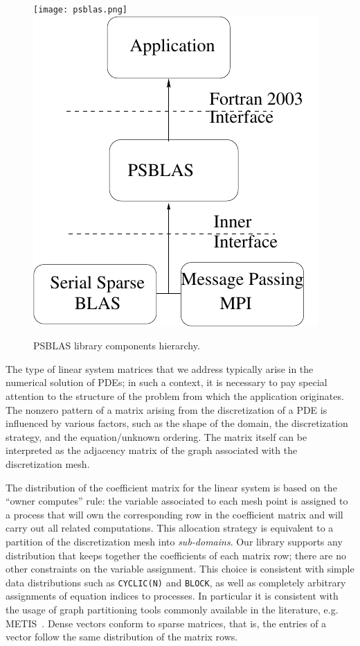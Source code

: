 \begin{figure}[h] 
\begin{center}
\ifcase\pdfoutput
\texttt{[image: psblas.png]}
\or
\includegraphics[scale=0.65]{figures/psblas}
\fi
\end{center}
\caption{PSBLAS library components hierarchy.\label{fig:psblas}}
\end{figure}


The type of linear system matrices that we address  typically arise in the
numerical solution of PDEs;  in such a context,
it is necessary to pay special attention to the
structure of the problem from which the application originates. 
The nonzero pattern of a matrix arising from the
discretization of a PDE is influenced by various factors, such as the
shape of the  domain, the discretization strategy, and
the equation/unknown ordering. The matrix itself can be interpreted as
the  adjacency matrix of the graph associated with the discretization
mesh. 

The distribution of the coefficient matrix for the linear system is
based on the ``owner computes'' rule: 
the variable associated to each mesh point is assigned to a process
that will  own the corresponding row in the coefficient matrix and
will  carry out all related computations. This allocation strategy 
is equivalent to a partition of the discretization mesh into {\em
sub-domains}. 
Our library  supports any distribution that keeps together 
the coefficients of each matrix row; there are no other constraints on
the variable assignment. 
This choice is consistent with simple  data distributions 
such as  \verb|CYCLIC(N)| and \verb|BLOCK|, 
as well as completely arbitrary assignments of
equation indices to processes. 
In particular it is consistent with the
usage of graph partitioning tools commonly available in the
literature, e.g. METIS~\cite{METIS}.
Dense vectors  conform  to sparse
matrices, that is, the entries of a vector follow the same distribution
of the matrix rows.  

